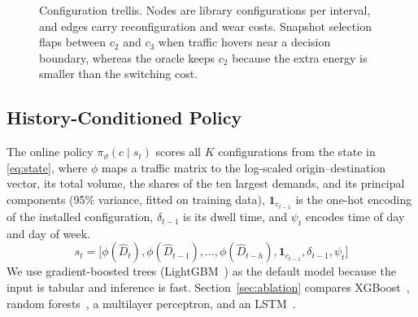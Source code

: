 \documentclass[conference]{IEEEtran}
\begin{document}
\begin{figure}[t]
\centering
{}
\caption{Configuration trellis. Nodes are library configurations per interval, and edges carry reconfiguration and wear costs. Snapshot selection flaps between $c_2$ and $c_3$ when traffic hovers near a decision boundary, whereas the oracle keeps $c_2$ because the extra energy is smaller than the switching cost.}
\label{fig:trellis}
\end{figure}

\subsection{History-Conditioned Policy}

The online policy $\pi_\vartheta(c\mid s_t)$ scores all $K$ configurations from the state in \eqref{eq:state}, where $\phi$ maps a traffic matrix to the log-scaled origin--destination vector, its total volume, the shares of the ten largest demands, and its principal components (95\% variance, fitted on training data), $\mathbf{1}_{c_{t-1}}$ is the one-hot encoding of the installed configuration, $\delta_{t-1}$ is its dwell time, and $\psi_t$ encodes time of day and day of week.
\begin{equation}\label{eq:state}
s_t=\big[\phi(\hat{D}_t),\phi(\hat{D}_{t-1}),\dots,\phi(\hat{D}_{t-h}),\mathbf{1}_{c_{t-1}},\delta_{t-1},\psi_t\big]
\end{equation}
We use gradient-boosted trees (LightGBM~\cite{ke2017lightgbm}) as the default model because the input is tabular and inference is fast. Section~\ref{sec:ablation} compares XGBoost~\cite{chen2016xgboost}, random forests~\cite{breiman2001rf}, a multilayer perceptron, and an LSTM~\cite{hochreiter1997lstm}.
\end{document}
